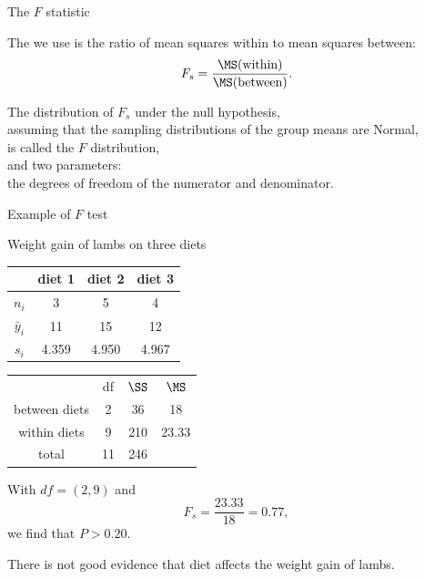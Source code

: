 \begin{frame}{The $F$ statistic}

    The  we use is the ratio of mean squares within to mean squares between:
    \[
        F_s = \frac{ \MS(\text{within}) }{ \MS(\text{between}) } .
    \]


    \vspace{2em}

    The distribution of $F_s$ under the null hypothesis,  \\
    assuming that the sampling distributions of the group means are Normal, \\
    is called the \alert{$F$ distribution}, \\
    and  two parameters: \\
    the degrees of freedom of the numerator and denominator.


\end{frame}


\begin{frame}{Example of $F$ test}

    Weight gain of lambs on three diets
    \begin{center}
        \begin{tabular}{cccc}
            & diet 1 & diet 2 & diet 3 \\
            \hline
            $n_i$ & 3 & 5 & 4 \\
            $\bar y_i$ & 11 & 15 & 12 \\
            $s_i$ & 4.359 & 4.950 & 4.967 \\
        \end{tabular}
    \end{center}

    \pause

    \begin{center}
        \begin{tabular}{cccc}
            & df & $\SS$ & $\MS$ \\
            between diets & 2 & 36 & 18 \\
            within diets & 9 & 210 & 23.33 \\
            \hline
            total & 11 & 246 & \\
        \end{tabular}
    \end{center}


    \vspace{2em}

    With $df = (2,9)$ and
    \[ F_s = \frac{ 23.33 }{ 18 } = 0.77 , \]
    we find that $P > 0.20$.


    \vspace{2em}

    \pause
    There is not good evidence that diet affects the weight gain of lambs.


\end{frame}




